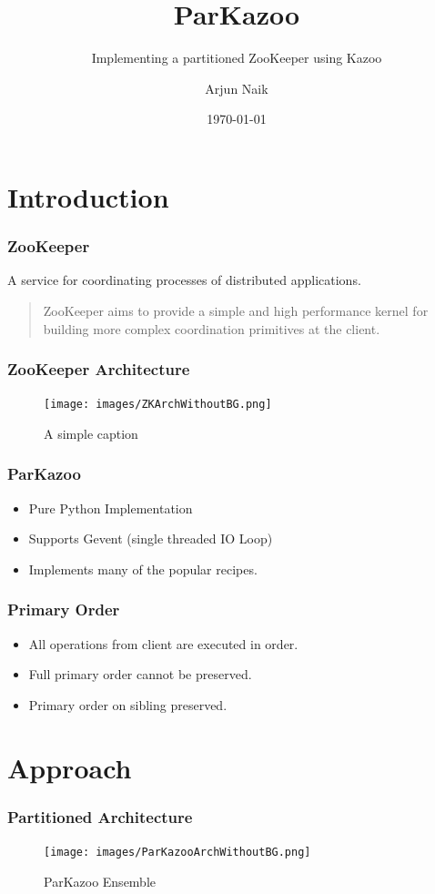 \documentclass[10pt, compress]{beamer}
\title{ParKazoo}
\subtitle{Implementing a partitioned ZooKeeper using Kazoo}
\date{\today}
\author{Arjun Naik}
\institute{TU Dresden}
\begin{document}
\maketitle

\section{Introduction}

\begin{frame}[fragile]
    \frametitle{ZooKeeper}
    A service for coordinating processes of distributed applications.
    \begin{quote}
        ZooKeeper aims to provide a simple and high performance kernel for building more complex
        coordination primitives at the client. 
    \end{quote}
\end{frame}

\begin{frame}[fragile]
    \frametitle{ZooKeeper Architecture}
    \begin{figure}[ht!]
        \centering
        \texttt{[image: images/ZKArchWithoutBG.png]}
        \caption{A simple caption \label{overflow}}
    \end{figure}
\end{frame}

\begin{frame}[fragile]
    \frametitle{ParKazoo}
    \begin{itemize}
        \item Pure Python Implementation
        \item Supports Gevent (single threaded IO Loop)
        \item Implements many of the popular recipes.
    \end{itemize}
\end{frame}

\begin{frame}[fragile]
    \frametitle{Primary Order}
    \begin{itemize}
        \item All operations from client are executed in order.
        \item Full primary order cannot be preserved.
        \item Primary order on sibling preserved.
    \end{itemize}
\end{frame}

\section{Approach}
\begin{frame}[fragile]
    \frametitle{Partitioned Architecture}
    \begin{figure}[ht!]
        \centering
        \texttt{[image: images/ParKazooArchWithoutBG.png]}
        \caption{ParKazoo Ensemble \label{overflow}}
    \end{figure}
\end{frame}
\end{document}
